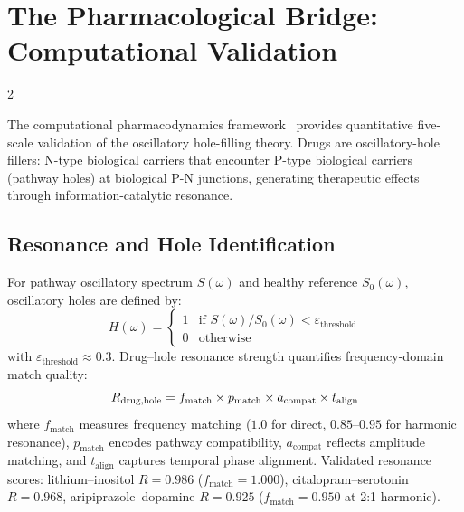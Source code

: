 \section{The Pharmacological Bridge: Computational Validation}
\label{sec:cc_pharma}

\begin{multicols}{2}

The computational pharmacodynamics framework~\citep{sachikonye2024_pharmacodynamics}
provides quantitative five-scale validation of the oscillatory hole-filling
theory.  Drugs are oscillatory-hole fillers: N-type biological carriers
that encounter P-type biological carriers (pathway holes) at biological P-N
junctions, generating therapeutic effects through information-catalytic
resonance.

\subsection{Resonance and Hole Identification}
\label{ssec:pharma_resonance}

For pathway oscillatory spectrum $S(\omega)$ and healthy reference $S_0(\omega)$,
oscillatory holes are defined by:
\begin{equation}
H(\omega) = \begin{cases}
1 & \text{if } S(\omega)/S_0(\omega) < \varepsilon_{\text{threshold}} \\
0 & \text{otherwise}
\end{cases}
\label{eq:hole_detection}
\end{equation}
with $\varepsilon_{\text{threshold}} \approx 0.3$.  Drug--hole resonance
strength quantifies frequency-domain match quality:
\begin{equation}
R_{\text{drug,hole}} = f_{\text{match}} \times p_{\text{match}} \times a_{\text{compat}} \times t_{\text{align}}
\label{eq:resonance_strength}
\end{equation}
where $f_{\text{match}}$ measures frequency matching ($1.0$ for direct,
$0.85$--$0.95$ for harmonic resonance), $p_{\text{match}}$ encodes pathway
compatibility, $a_{\text{compat}}$ reflects amplitude matching, and
$t_{\text{align}}$ captures temporal phase alignment.  Validated resonance
scores: lithium--inositol $R = 0.986$ ($f_{\text{match}} = 1.000$),
citalopram--serotonin $R = 0.968$, aripiprazole--dopamine $R = 0.925$
($f_{\text{match}} = 0.950$ at 2:1 harmonic).


\end{multicols}
